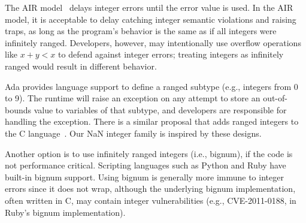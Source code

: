 The AIR model~\cite{air} delays integer errors until the error value
is used.  In the AIR model, it is acceptable to delay
catching integer semantic violations and raising traps, as long as the program's
behavior is the same as if all integers were infinitely ranged.
Developers, however, may intentionally use overflow operations like
$x + y < x$ to defend against integer errors; treating integers as
infinitely ranged would result in different behavior.
\fi

Ada provides language support
to define a ranged subtype (e.g., integers from 0 to 9).  The runtime
will raise an exception on any attempt to store an out-of-bounds
value to variables of that subtype, and developers are responsible
for handling the exception.  There is a similar proposal that adds
ranged integers to the C language~\cite{ranged-c}.  Our NaN integer family is
inspired by these designs.

Another option is to use infinitely ranged integers (i.e., bignum),
if the code is not performance critical.  Scripting languages such
as Python and Ruby have built-in bignum support.  Using bignum is
generally more immune to integer errors since it does not wrap,
although the underlying bignum implementation, often written in C,
may contain integer vulnerabilities (e.g., CVE-2011-0188,
in Ruby's bignum implementation).
\fi
%





